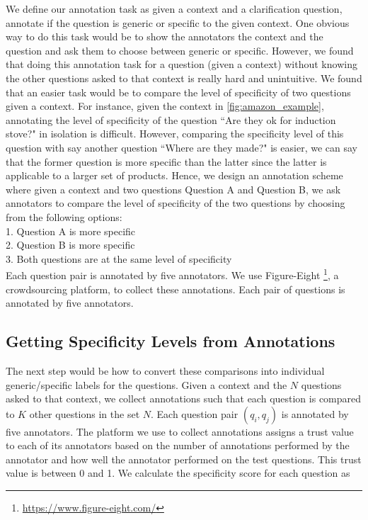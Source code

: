 \documentclass[11pt,a4paper]{article}
\begin{document}
We define our annotation task as given a context and a clarification question, annotate if the question is generic or specific to the given context. One obvious way to do this task would be to show the annotators the context and the question and ask them to choose between generic or specific. However, we found that doing this annotation task for a question (given a context)  without knowing the other questions asked to that context is really hard and unintuitive. We found that an easier task would be to compare the level of specificity of two questions given a context. For instance, given the context in \autoref{fig:amazon_example}, annotating the level of specificity of the question  ``Are they ok for induction stove?" in isolation is difficult. However, comparing the specificity level of this question with say another question ``Where are they made?" is easier, we can say that the former question is more specific than the latter since the latter is applicable to a larger set of products.  Hence, we design an annotation scheme where given a context and two questions Question A and Question B, we ask annotators to compare the level of specificity of the two questions by choosing from the following options:\\
1. Question A is more specific \\
2. Question B is more specific \\
3. Both questions are at the same level of specificity\\
Each question pair is annotated by five annotators. 
We use Figure-Eight \footnote{\url{https://www.figure-eight.com/}}, a crowdsourcing platform, to collect these annotations. Each pair of questions is annotated by five annotators. 


\subsection{Getting Specificity Levels from Annotations}

The next step would be how to convert these comparisons into individual generic/specific labels for the questions. Given a context and the $N$ questions asked to that context, we collect annotations such that each question is compared to $K$ other questions in the set $N$. Each question pair $(q_i, q_j)$ is annotated by five annotators. The platform we use to collect annotations assigns a trust value to each of its annotators based on the number of annotations performed by the annotator and how well the annotator performed on the test questions. This trust value is between 0 and 1. We calculate the specificity score for each question as \\
\end{document}
